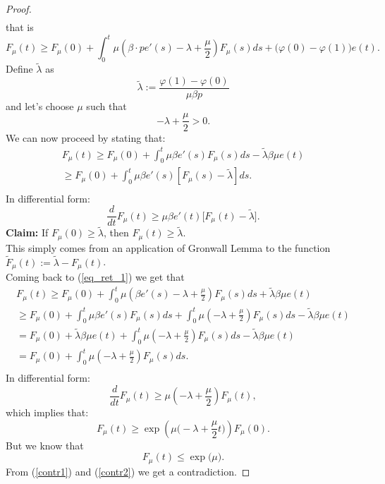 \begin{proof}
\begin{multline*}
\end{multline*} that is 
\begin{equation} \label{eq_ret_1} F_\mu(t) \geq F_\mu(0)+\int_0^t\mu\left(\beta\cdot p e'(s)-\lambda+\frac{\mu}{2}\right)F_\mu(s)ds+\Big(\varphi(0)-\varphi(1)\Big)e(t). \end{equation}
Define $\tilde{\lambda}$ as
\[\tilde{\lambda} := \frac{\varphi(1)-\varphi(0)}{\mu\beta p} \]
and let's choose $\mu$ such that
\[-\lambda+\frac{\mu}{2}>0.\]
We can now proceed by stating that:
\begin{multline*}
F_\mu(t) \geq  F_\mu(0) + \int_0^t \mu \beta e'(s)F_\mu(s)ds-\tilde{\lambda}\beta\mu e(t)\\
\geq F_\mu(0)+\int_0^t\mu\beta e'(s)[F_\mu(s)-\tilde{\lambda}]ds.\\
\end{multline*}
In differential form:
\begin{equation}
\frac{d}{dt}F_\mu(t)\geq \mu\beta e'(t)\Big[F_\mu(t)-\tilde{\lambda}\Big].
\end{equation}
\textbf{Claim:} If $F_\mu(0)\geq \tilde{\lambda}$, then $F_\mu(t)\geq \tilde{\lambda}$. \\
This simply comes from an application of Gronwall Lemma to the function $\tilde{F}_\mu(t) := \tilde{\lambda} - F_\mu(t)$. \\

Coming back to (\ref{eq_ret_1}) we get that
\begin{multline*}
F_\mu(t)\geq F_\mu(0)+\int_0^t\mu\left(\beta e'(s)-\lambda +\frac{\mu}{2}\right)F_\mu(s)ds+\tilde{\lambda}\beta\mu e(t)\\
\geq F_\mu(0)+\int_0^t\mu\beta e'(s)F_\mu(s)ds+\int_0^t \mu \left(-\lambda +\frac{\mu}{2} \right) F_\mu(s)ds-\tilde{\lambda}\beta\mu e(t)\\
=F_\mu(0)+\tilde{\lambda}\beta\mu e(t)+\int_0^t \mu \left(-\lambda +\frac{\mu}{2} \right) F_\mu(s)ds-\tilde{\lambda}\beta\mu e(t)\\
=F_\mu(0)+\int_0^t \mu \left( -\lambda +\frac{\mu}{2} \right) F_\mu(s)ds.\\
\end{multline*}
In differential form:
\[ \frac{d}{dt}F_\mu(t) \geq \mu \left( -\lambda+\frac{\mu}{2} \right) F_\mu(t), \]
which implies that:
\begin{equation} \label{contr1} F_\mu(t)\geq \exp \left( \mu \Big( -\lambda+\frac{\mu}{2}t \Big) \right) F_\mu(0). \end{equation}
But we know that
\begin{equation} \label{contr2} F_\mu(t)\leq\exp \big( \mu \big). \end{equation}
From (\ref{contr1}) and (\ref{contr2}) we get a contradiction.
\end{proof}
